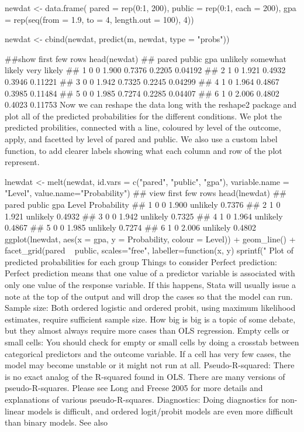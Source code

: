 \documentclass[00-GLMregression.tex]{subfiles}
\begin{document}
newdat <- data.frame(
  pared = rep(0:1, 200),
  public = rep(0:1, each = 200),
  gpa = rep(seq(from = 1.9, to = 4, length.out = 100), 4))

newdat <- cbind(newdat, predict(m, newdat, type = "probs"))

##show first few rows
head(newdat)
##   pared public   gpa unlikely somewhat likely very likely
## 1     0      0 1.900   0.7376          0.2205     0.04192
## 2     1      0 1.921   0.4932          0.3946     0.11221
## 3     0      0 1.942   0.7325          0.2245     0.04299
## 4     1      0 1.964   0.4867          0.3985     0.11484
## 5     0      0 1.985   0.7274          0.2285     0.04407
## 6     1      0 2.006   0.4802          0.4023     0.11753
Now we can reshape the data long with the reshape2 package and plot all of the predicted probabilities for the different conditions. We plot the predicted probilities, connected with a line, coloured by level of the outcome, apply, and facetted by level of pared and public. We also use a custom label function, to add clearer labels showing what each column and row of the plot represent.

lnewdat <- melt(newdat, id.vars = c("pared", "public", "gpa"),
  variable.name = "Level", value.name="Probability")
## view first few rows
head(lnewdat)
##   pared public   gpa    Level Probability
## 1     0      0 1.900 unlikely      0.7376
## 2     1      0 1.921 unlikely      0.4932
## 3     0      0 1.942 unlikely      0.7325
## 4     1      0 1.964 unlikely      0.4867
## 5     0      0 1.985 unlikely      0.7274
## 6     1      0 2.006 unlikely      0.4802
ggplot(lnewdat, aes(x = gpa, y = Probability, colour = Level)) +
  geom_line() +
  facet_grid(pared ~ public, scales="free",
    labeller=function(x, y) sprintf("%
Plot of predicted probabilities for each group
Things to consider
Perfect prediction: Perfect prediction means that one value of a predictor variable is associated with only one value of the response variable. If this happens, Stata will usually issue a note at the top of the output and will drop the cases so that the model can run.
Sample size: Both ordered logistic and ordered probit, using maximum likelihood estimates, require sufficient sample size. How big is big is a topic of some debate, but they almost always require more cases than OLS regression.
Empty cells or small cells: You should check for empty or small cells by doing a crosstab between categorical predictors and the outcome variable. If a cell has very few cases, the model may become unstable or it might not run at all.
Pseudo-R-squared: There is no exact analog of the R-squared found in OLS. There are many versions of pseudo-R-squares. Please see Long and Freese 2005 for more details and explanations of various pseudo-R-squares.
Diagnostics: Doing diagnostics for non-linear models is difficult, and ordered logit/probit models are even more difficult than binary models.
See also

\end{document}

